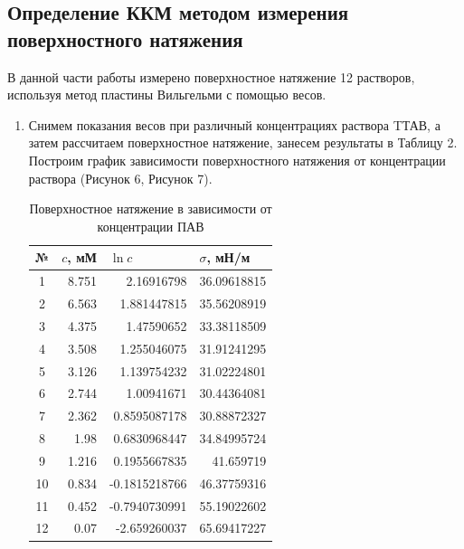 \documentclass[a4paper,12pt]{article}
\begin{document}
\subsection{Определение ККМ методом измерения поверхностного натяжения}
В данной части работы измерено поверхностное натяжение 12 растворов, используя метод пластины Вильгельми с помощью весов.
\begin{enumerate}
    \item Снимем показания весов при различный концентрациях раствора TТАВ, а затем рассчитаем поверхностное натяжение, занесем результаты в Таблицу 2. Построим график зависимости поверхностного натяжения от концентрации раствора (Рисунок 6, Рисунок 7).

\begin{table}[h!]
\centering
\begin{tabular}{|c|r|r|r|}
\hline
№  & \multicolumn{1}{l|}{$c$, мМ} & \multicolumn{1}{l|}{$\ln{c}$} & \multicolumn{1}{l|}{$\sigma$, мН/м} \\ \hline
1  & 8.751                        & 2.16916798                    & 36.09618815                         \\ \hline
2  & 6.563                        & 1.881447815                   & 35.56208919                         \\ \hline
3  & 4.375                        & 1.47590652                    & 33.38118509                         \\ \hline
4  & 3.508                        & 1.255046075                   & 31.91241295                         \\ \hline
5  & 3.126                        & 1.139754232                   & 31.02224801                         \\ \hline
6  & 2.744                        & 1.00941671                    & 30.44364081                         \\ \hline
7  & 2.362                        & 0.8595087178                  & 30.88872327                         \\ \hline
8  & 1.98                         & 0.6830968447                  & 34.84995724                         \\ \hline
9  & 1.216                        & 0.1955667835                  & 41.659719                           \\ \hline
10 & 0.834                        & -0.1815218766                 & 46.37759316                         \\ \hline
11 & 0.452                        & -0.7940730991                 & 55.19022602                         \\ \hline
12 & 0.07                         & -2.659260037                  & 65.69417227                         \\ \hline
\end{tabular}
\caption{Поверхностное натяжение в зависимости от концентрации ПАВ}
\label{tab:my-table}
\end{table}


\end{enumerate}
\end{document}
